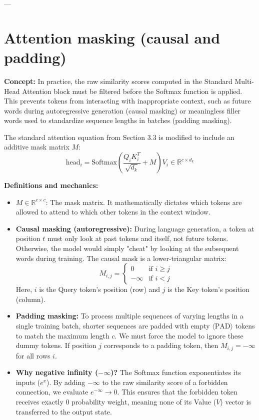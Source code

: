 \documentclass[11pt]{article}
\begin{document}
	---
	
	\section{Attention masking (causal and padding)}
	\textbf{Concept:} In practice, the raw similarity scores computed in the Standard Multi-Head Attention block must be filtered before the Softmax function is applied. This prevents tokens from interacting with inappropriate context, such as future words during autoregressive generation (causal masking) or meaningless filler words used to standardize sequence lengths in batches (padding masking).
	
	The standard attention equation from Section 3.3 is modified to include an additive mask matrix $M$:
	\begin{equation}
		\text{head}_i = \text{Softmax}\left(\frac{Q_i K_i^T}{\sqrt{d_k}} + M\right) V_i \in \mathbb{R}^{c \times d_k}
	\end{equation}
	
	\textbf{Definitions and mechanics:}
	\begin{itemize}
		\item $M \in \mathbb{R}^{c \times c}$: The mask matrix. It mathematically dictates which tokens are allowed to attend to which other tokens in the context window.
		\item \textbf{Causal masking (autoregressive):} During language generation, a token at position $t$ must only look at past tokens and itself, not future tokens. Otherwise, the model would simply "cheat" by looking at the subsequent words during training. The causal mask is a lower-triangular matrix:
		\begin{equation}
			M_{i,j} = 
			\begin{cases} 
				0 & \text{if } i \ge j \\
				-\infty & \text{if } i < j
			\end{cases}
		\end{equation}
		Here, $i$ is the Query token's position (row) and $j$ is the Key token's position (column).
		\item \textbf{Padding masking:} To process multiple sequences of varying lengths in a single training batch, shorter sequences are padded with empty $\langle \text{PAD} \rangle$ tokens to match the maximum length $c$. We must force the model to ignore these dummy tokens. If position $j$ corresponds to a padding token, then $M_{i,j} = -\infty$ for all rows $i$.
		\item \textbf{Why negative infinity ($-\infty$)?} The Softmax function exponentiates its inputs ($e^x$). By adding $-\infty$ to the raw similarity score of a forbidden connection, we evaluate $e^{-\infty} \to 0$. This ensures that the forbidden token receives exactly $0$ probability weight, meaning none of its Value ($V$) vector is transferred to the output state.
	\end{itemize}
	
\end{document}
